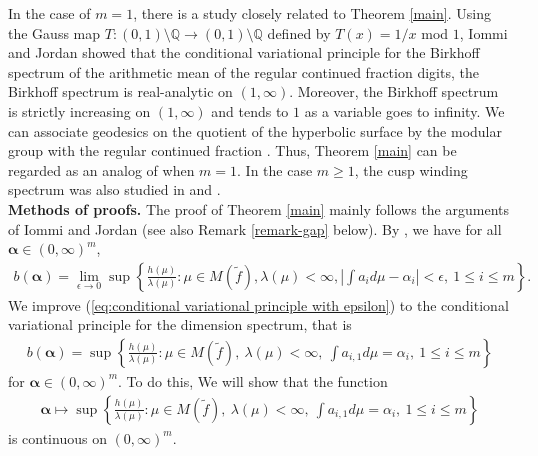 \documentclass{article}
\theoremstyle{definition}
\begin{document}
In the case of $m=1$, there is a study closely related to Theorem \ref{main}.
 Using the Gauss map $T:(0,1)\setminus\mathbb{Q}\rightarrow(0,1)\setminus\mathbb{Q}$ defined by $T(x)=1/x$ mod $1$, Iommi and Jordan \cite[Corollary 6.6]{iommi2015multifractal} showed that the conditional variational principle for the Birkhoff spectrum of the arithmetic mean of the regular continued fraction digits, the Birkhoff spectrum is real-analytic on $(1,\infty)$. Moreover, the Birkhoff spectrum is strictly increasing on $(1,\infty)$ and tends to $1$ as a variable goes to infinity. 
 We can associate geodesics on the quotient of the hyperbolic surface by the modular group with the regular continued fraction \cite{series1985modular}. Thus, Theorem \ref{main} can be regarded as an analog of \cite[Corollary 6.6]{iommi2015multifractal} when $m=1$. In the case $m\geq 1$, the cusp winding spectrum was also studied in \cite{Jaerisch2016AMA} and \cite{Munday2011OnHD}.\\ 
 

 

\textbf{Methods of proofs.}
The proof of Theorem \ref{main} mainly follows the arguments of Iommi and Jordan \cite{iommi2015multifractal} (see also Remark \ref{remark-gap}  below). By \cite[Proposition 2.1]{jaerisch2021mixed},  we have for all $\boldsymbol{\alpha}\in(0,\infty)^m$, 
\begin{align}\label{eq:conditional variational principle with epsilon}
 b(\boldsymbol{\alpha}) = \lim_{\epsilon \to 0}\sup \left\{ \frac{h(\mu)}{\lambda(\mu)}: \mu \in M(\tilde f),\lambda(\mu)<\infty, \left|\int a_i d \mu - \alpha_i  \right|<\epsilon,\ 1\leq i\leq m 
   \right\}.
\end{align}
We improve  (\ref{eq:conditional variational principle with epsilon}) to the conditional variational principle for the dimension spectrum, that is 
\begin{align}\label{eq conditional variational principle}
    b(\boldsymbol{\alpha})=\sup\left\{\frac{h(\mu)}{\lambda(\mu)}:\mu\in M(\tilde f),\ \lambda(\mu)<\infty,\ \int a_{i,1}d\mu=\alpha_i,\ 1\leq i\leq m\right\}
\end{align}
for $\boldsymbol{\alpha}\in(0,\infty)^m$. To do this, 
We will show that the function 
\begin{align*}
\boldsymbol{\alpha}\mapsto\sup\left\{\frac{h(\mu)}{\lambda(\mu)}:\mu\in M(\tilde f),\ \lambda(\mu)<\infty,\ \int a_{i,1}d\mu=\alpha_i,\ 1\leq i\leq m\right\}
\end{align*}
is continuous on $(0,\infty)^m$. 
\end{document}
